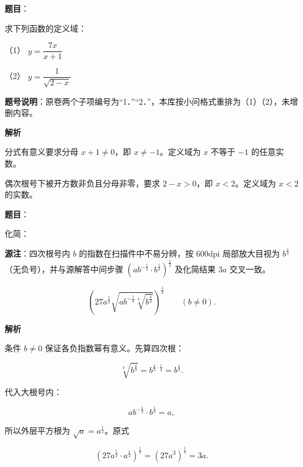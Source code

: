 \begin{answer}

\textbf{题目}：

求下列函数的定义域：

（1） $y=\dfrac{7x}{x+1}$

（2） $y=\dfrac{1}{\sqrt{2-x}}$

\begin{gktip}
\textbf{题号说明}：原卷两个子项编号为“1．”“2．”，本库按小问格式重排为（1）（2），未增删内容。
\end{gktip}

\textbf{解析}


分式有意义要求分母 $x+1\ne0$，即 $x\ne-1$。定义域为 $x$ 不等于 $-1$ 的任意实数。


偶次根号下被开方数非负且分母非零，要求 $2-x>0$，即 $x<2$。定义域为 $x<2$ 的实数。



\end{answer}
\begin{answer}

\textbf{题目}：

化简：

\begin{gktip}
\textbf{源注}：四次根号内 $b$ 的指数在扫描件中不易分辨，按 600dpi 局部放大目视为 $b^{\frac43}$（无负号），并与源解答中间步骤 $(ab^{-\frac13}\cdot b^{\frac13})^{\frac12}$ 及化简结果 $3a$ 交叉一致。
\end{gktip}

\nopagebreak[4]
\[
\left(27a^{\frac52}\sqrt{ab^{-\frac13}\sqrt[4]{b^{\frac43}}}\right)^{\frac13}\qquad(b\ne0).
\]

\textbf{解析}

条件 $b\ne0$ 保证各负指数幂有意义。先算四次根：

\nopagebreak[4]
\[
\sqrt[4]{b^{\frac43}}=b^{\frac{4}{3}\cdot\frac14}=b^{\frac13}.
\]

代入大根号内：

\nopagebreak[4]
\[
ab^{-\frac13}\cdot b^{\frac13}=a,
\]

所以外层平方根为 $\sqrt a=a^{\frac12}$。原式

\nopagebreak[4]
\[
\left(27a^{\frac52}\cdot a^{\frac12}\right)^{\frac13}
=\left(27a^3\right)^{\frac13}
=3a.
\]


\end{answer}
